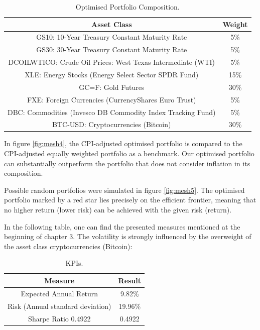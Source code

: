 \documentclass{article}
\begin{document}
\begin{table}[H]
\centering
\begin{tabular}{ | c | c | }
 \hline
 \textbf{Asset Class} & \textbf{Weight} \\
 \hline
 GS10: 10-Year Treasury Constant Maturity Rate & 5\% \\ 
 \hline
 GS30: 30-Year Treasury Constant Maturity Rate & 5\% \\
 \hline
 DCOILWTICO: Crude Oil Prices: West Texas Intermediate (WTI) & 5\% \\ 
 \hline
 XLE: Energy Stocks (Energy Select Sector SPDR Fund) & 15\% \\ 
 \hline
 GC=F: Gold Futures & 30\% \\ 
 \hline
 FXE: Foreign Currencies (CurrencyShares Euro Trust) & 5\% \\
 \hline
 DBC: Commodities (Invesco DB Commodity Index Tracking Fund) & 5\% \\ 
 \hline
 BTC-USD: Cryptocurrencies (Bitcoin) & 30\% \\ 
 \hline
\end{tabular}
 \label{table:tab1}
 \caption{Optimised Portfolio Composition.}
\end{table}

In figure \ref{fig:mesh4}, the CPI-adjusted optimised portfolio is compared to the CPI-adjusted equally weighted portfolio as a benchmark. Our optimised portfolio can substantially outperform the portfolio that does not consider inflation in its composition.

Possible random portfolios were simulated in figure \ref{fig:mesh5}. The optimised portfolio marked by a red star lies precisely on the efficient frontier, meaning that no higher return (lower risk) can be achieved with the given risk (return).

In the following table, one can find the presented measures mentioned at the beginning of chapter 3. The volatility is strongly influenced by the overweight of the asset class cryptocurrencies (Bitcoin):

\begin{table}[H]
\centering
\begin{tabular}{ | c | c | }
 \hline
 \textbf{Measure} & \textbf{Result} \\
 \hline
 Expected Annual Return & 9.82\% \\ 
 \hline
 Risk (Annual standard deviation) & 19.96\% \\
 \hline
 Sharpe Ratio 0.4922 & 0.4922 \\ 
 \hline
\end{tabular}
 \label{table:tab2}
 \caption{KPIs.}
\end{table}
\end{document}
